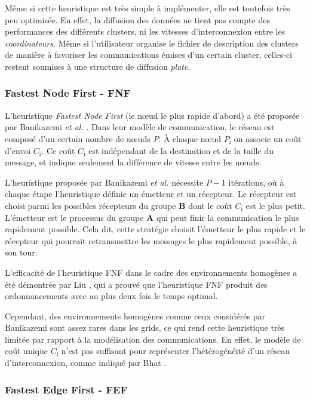 Même si cette heuristique est très simple à implémenter, elle est toutefois
très peu optimisée. En effet, la diffusion des données ne tient pas
compte des performances des différents  clusters, ni les vitesses d'interconnexion
entre les \emph{coordinateurs}. Même si l'utilisateur organise le
fichier de description des  clusters de manière à favoriser les communications
émises d'un certain  cluster, celles-ci restent soumises à une structure
de diffusion \emph{plate}. 


\subsubsection*{Fastest Node First - FNF}

L'heuristique \emph{Fastest Node First} (le n{\oe}ud le plus rapide d'abord)
a été proposée par Banikazemi \emph{et al.} \cite{Banikazemi98}.
Dans leur modèle de communication, le réseau est composé d'un certain
nombre de n{\oe}uds \emph{$P$}. À chaque n{\oe}ud \emph{$P_{\textrm{i}}$}
on associe un coût d'envoi \emph{$C_{\textrm{i}}$}. Ce coût \emph{$C_{\textrm{i}}$}
est indépendant de la destination et de la taille du message, et indique
seulement la différence de vitesse entre les n{\oe}uds.

L'heuristique proposée par Banikazemi \emph{et al.} nécessite $P-1$
itérations, où à chaque étape l'heuristique définie un émetteur et
un récepteur. Le récepteur est choisi parmi les possibles récepteurs
du groupe \textbf{B} dont le coût \emph{$C_{\textrm{i}}$} est le
plus petit. L'émetteur est le processus du groupe \textbf{A} qui peut
finir la communication le plus rapidement possible. Cela dit, cette
stratégie choisit l'émetteur le plus rapide et le récepteur qui pourrait
retransmettre les messages le plus rapidement possible, à son tour.

L'efficacité de l'heuristique FNF dans le cadre des environnements
homogènes a été démontrée par Liu \cite{PangfengLiu00b}, qui a prouvé que
l'heuristique FNF produit des ordonnancements avec au plus deux fois
le temps optimal.

Cependant, des environnements homogènes comme ceux considérés par
Banikazemi sont assez rares dans les grids, ce qui rend cette heuristique
très limitée par rapport à la modélisation des communications. En
effet, le modèle de coût unique $C_{\textrm{i}}$ n'est pas suffisant
pour représenter l'hétérogénéité d'un réseau d'interconnexion, comme
indiqué par Bhat \cite{Bhat03}. 


\subsubsection*{Fastest Edge First - FEF}

